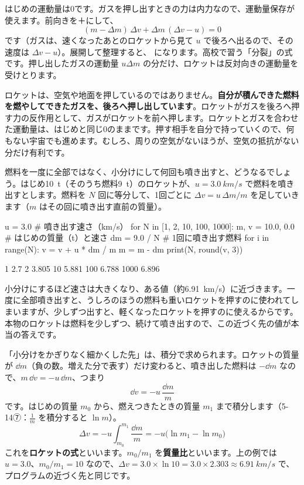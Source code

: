 \par\vspace{4pt}
はじめの運動量は0です。ガスを押し出すときの力は内力なので、運動量保存が使えます。前向きを＋にして、
\[(m-\Delta m)\,\Delta v+\Delta m\,(\Delta v-u)=0\]
です（ガスは、速くなったあとのロケットから見て $u$ で後ろへ出るので、その速度は $\Delta v-u$）。展開して整理すると、
\label{ph:力-3:bunretsu}になります。高校で習う「分裂」の式です。押し出したガスの運動量 $u\Delta m$ の分だけ、ロケットは反対向きの運動量を受けとります。

ロケットは、空気や地面を押しているのではありません。\textbf{自分が積んできた燃料を燃やしてできたガスを、後ろへ押し出しています}。ロケットがガスを後ろへ押す力の反作用として、ガスがロケットを前へ押します。ロケットとガスを合わせた運動量は、はじめと同じ0のままです。押す相手を自分で持っていくので、何もない宇宙でも進めます。むしろ、周りの空気がないほうが、空気の抵抗がない分だけ有利です。

燃料を一度に全部ではなく、小分けにして何回も噴き出すと、どうなるでしょう。はじめ\qty{10}{t}（そのうち燃料\qty{9}{t}）のロケットが、$u=\qty{3.0}{km/s}$ で燃料を噴き出すとします。燃料を $N$ 回に等分して、1回ごとに $\Delta v=u\,\Delta m/m$ を足していきます（$m$ はその回に噴き出す直前の質量）。
\begin{phcode}
u = 3.0              \# 噴き出す速さ（km/s）\hfill\null
for N in [1, 2, 10, 100, 1000]:
    m, v = 10.0, 0.0 \# はじめの質量（t）と速さ
    dm = 9.0 / N     \# 1回に噴き出す燃料
    for i in range(N):
        v = v + u * dm / m
        m = m - dm
    print(N, round(v, 3))
\end{phcode}
\begin{phcodeout}
1 2.7
2 3.805
10 5.881
100 6.788
1000 6.896
\end{phcodeout}
小分けにするほど速さは大きくなり、ある値（約\qty{6.91}{km/s}）に近づきます。一度に全部噴き出すと、うしろのほうの燃料も重いロケットを押すのに使われてしまいますが、少しずつ出すと、軽くなったロケットを押すのに使えるからです。本物のロケットは燃料を少しずつ、続けて噴き出すので、この近づく先の値が本当の答えです。

「小分けをかぎりなく細かくした先」は、積分で求められます。ロケットの質量が $\dd m$（負の数。増えた分で表す）だけ変わると、噴き出した燃料は $-\dd m$ なので、$m\,\dd v=-u\,\dd m$、つまり
\[\dd v=-u\,\frac{\dd m}{m}\]
です。はじめの質量 $m_0$ から、燃えつきたときの質量 $m_1$ まで積分します（\mbox{5-14⑦}：$\tfrac{1}{m}$ を積分すると $\ln m$）。
\[\Delta v=-u\int_{m_0}^{m_1}\frac{\dd m}{m}=-u\bigl(\ln m_1-\ln m_0\bigr)\]
これを\textbf{ロケットの式}といいます。$m_0/m_1$ を\textbf{質量比}といいます。上の例では $u=3.0$、$m_0/m_1=10$ なので、$\Delta v=3.0\times\ln10=3.0\times2.303\approx\qty{6.91}{km/s}$ で、プログラムの近づく先と同じです。

